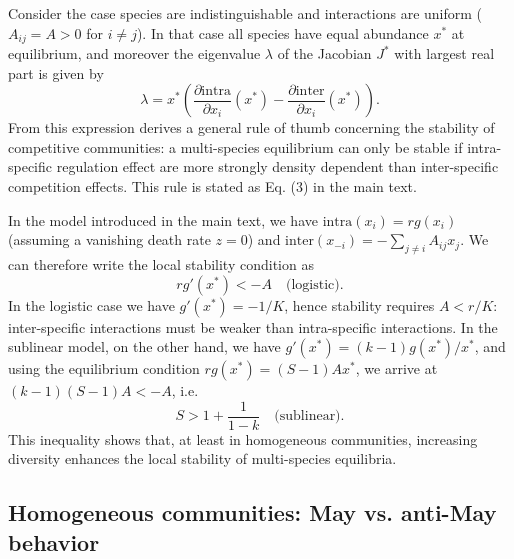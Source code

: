 \documentclass[12pt]{article}
\newcommand{\inter}{\textrm{inter}}
\newcommand{\intra}{\textrm{intra}}
\begin{document}
Consider the case species are indistinguishable and interactions are uniform ($A_{ij} = A>0$ for $i\neq j$). In that case all species have equal abundance $x^*$ at equilibrium, and moreover the eigenvalue $\lambda$ of the Jacobian $J^*$ with largest real part is given by
\begin{equation}
    \lambda = x^* \left(\frac{\partial \intra}{\partial x_i}(x^*) - \frac{\partial \inter}{\partial x_i}(x^*)\right). 
\end{equation}
From this expression derives a general rule of thumb concerning the stability of competitive communities: a multi-species equilibrium can only be stable if intra-specific regulation effect are more strongly density dependent than inter-specific competition effects. This rule is stated as Eq. (3) in the main text. 

In the model introduced in the main text, we have $\intra(x_i) = rg(x_i)$ (assuming a vanishing death rate $z = 0$) and $\inter(x_{-i}) = -\sum_{j\neq i}A_{ij} x_j$. We can therefore write the local stability condition as
\begin{equation}
    rg'(x^*) < - A \quad \textrm{(logistic)}.
\end{equation}
In the logistic case we have $g'(x^*) = -1/K$, hence stability requires $A < r/K$: inter-specific interactions must be weaker than intra-specific interactions. In the sublinear model, on the other hand, we have $g'(x^*) = (k-1)g(x^*)/x^*$, and using the equilibrium condition $rg(x^*) = (S-1)Ax^*$, we arrive at $(k-1)(S-1)A < - A$, i.e. 
\begin{equation}
    S > 1 + \frac{1}{1-k} \quad \textrm{(sublinear)}.
\end{equation}
This inequality shows that, at least in homogeneous communities, increasing diversity enhances the local stability of multi-species equilibria. 

\subsection{Homogeneous communities: May vs. anti-May behavior}
\end{document}
